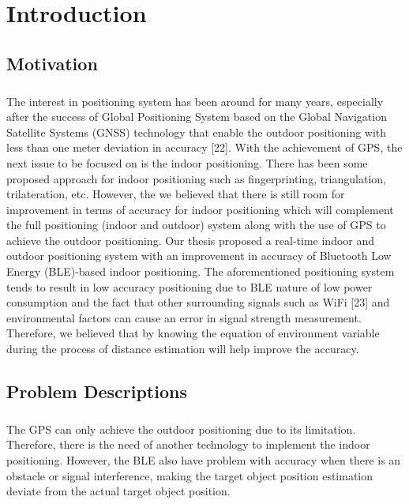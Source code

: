 \chapter{Introduction}
\section{Motivation}
\paragraph{}The interest in positioning system has been around for many years, especially after the success of Global Positioning System based on the Global Navigation Satellite Systems (GNSS) technology that enable the outdoor positioning with less than one meter deviation in accuracy [22]. With the achievement of GPS, the next issue to be focused on is the indoor positioning. There has been some proposed approach for indoor positioning such as fingerprinting, triangulation, trilateration, etc. However, the we believed that there is still room for improvement in terms of accuracy for indoor positioning which will complement the full positioning (indoor and outdoor) system along with the use of GPS to achieve the outdoor positioning.
Our thesis proposed a real-time indoor and outdoor positioning system with an improvement in accuracy of Bluetooth Low Energy (BLE)-based indoor positioning. The aforementioned positioning system tends to result in low accuracy positioning due to BLE nature of low power consumption and the fact that other surrounding signals such as WiFi [23] and environmental factors can cause an error in signal strength measurement. Therefore, we believed that by knowing the equation of environment variable during the process of distance estimation will help improve the accuracy.



\section{Problem Descriptions}
\paragraph{}The GPS can only achieve the outdoor positioning due to its limitation. Therefore, there is the need of another technology to implement the indoor positioning. However, the BLE also have problem with accuracy when there is an obstacle or signal interference, making the target object position estimation deviate from the actual target object position.


